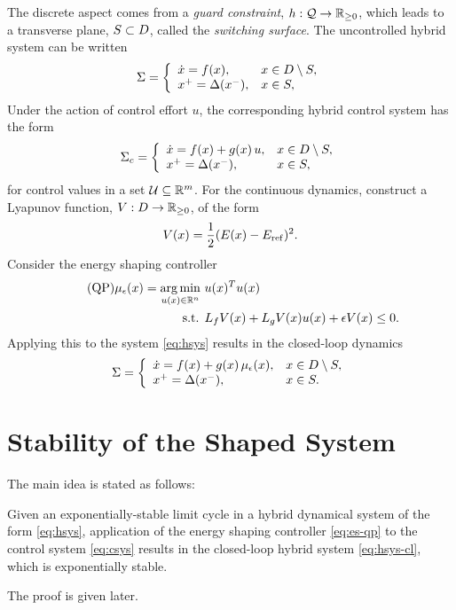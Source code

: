 \documentclass[twocolumn]{article}
\begin{document}
The discrete aspect comes from a {\em guard constraint}, $h : \mathcal{Q} \to \mathbb{R}_{\geq 0}$, which leads to a transverse plane, $S \subset D$, called the {\em switching surface}.
%
The uncontrolled hybrid system can be written
\begin{align}
  \Sigma = \left\{
  \begin{array}{l l}
    {\dot x} = f(x), & x \in D \setminus S,\\
    x^{+} = \Delta(x^{-}), &x \in S,
  \end{array}\right.
  \label{eq:hsys}
\end{align}
Under the action of control effort $u$, the corresponding hybrid control system has the form
\begin{align}
  \Sigma_{c} = \left\{
  \begin{array}{l l}
    {\dot x} = f(x) + g(x) \, u, & x \in D \setminus S,\\
    x^{+} = \Delta(x^{-}), &x \in S,
  \end{array}\right.
  \label{eq:csys}
\end{align}
for control values in a set $\mathcal{U} \subseteq \mathbb{R}^{m}$.
%
For the continuous dynamics, construct a Lyapunov function, $V : D \to \mathbb{R}_{\geq 0}$, of the form
\begin{align}
  \label{eq:lyap}
  V(x) = \frac{1}{2} (E(x) - E_{\mathrm{ref}})^2.
\end{align}
Consider the energy shaping controller
\begin{align}
  \label{eq:es-qp} \tag {QP}
  \mu_{\epsilon}(x) = \operatorname*{arg\,min}_{u(x) \in \mathbb{R}^{n}} \ & u(x)^T u(x)\\
  \nonumber
  \mbox{s.t. } & L_{f} V(x) + L_{g} V(x) u(x) + \epsilon V(x) \leq 0.
\end{align}
Applying this to the system \eqref{eq:hsys} results in the closed-loop dynamics
\begin{align}
  \label{eq:hsys-cl}
  \Sigma = \left\{
  \begin{array}{l l}
    {\dot x} = f(x) + g(x) \, \mu_{\epsilon}(x), & x \in D \setminus S,\\
    x^{+} = \Delta(x^{-}), &x \in S.
  \end{array}\right.
\end{align}



\section{Stability of the Shaped System}

The main idea is stated as follows:
%
\begin{theorem}
  Given an exponentially-stable limit cycle in a hybrid dynamical system of the form \eqref{eq:hsys}, application of the energy shaping controller \eqref{eq:es-qp} to the control system \eqref{eq:csys} results in the closed-loop hybrid system \eqref{eq:hsys-cl}, which is exponentially stable.
\end{theorem}
%
The proof is given later.
\end{document}
